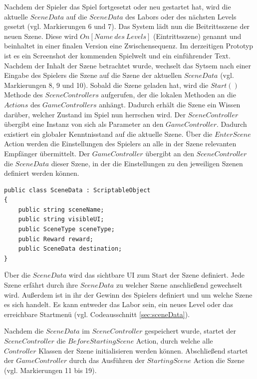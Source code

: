 Nachdem der Spieler das Spiel fortgesetzt oder neu gestartet hat, wird die aktuelle $SceneData$ auf die $SceneData$ des Labors oder des nächsten Levels gesetzt (vgl. Markierungen 6 und 7). Das System lädt nun die Beitrittsszene der neuen Szene. Diese wird $On[Name~ des~ Levels]$ (Eintrittsszene) genannt und beinhaltet in einer finalen Version eine Zwischensequenz. Im derzeitigen Prototyp ist es ein Screenshot der kommenden Spielwelt und ein einführender Text. Nachdem der Inhalt der Szene betrachtet wurde, wechselt das Sytsem nach einer Eingabe des Spielers die Szene auf die Szene der aktuellen $SceneData$ (vgl. Markierungen 8, 9 und 10). Sobald die Szene geladen hat, wird die $Start()$ Methode des $SceneControllers$ aufgerufen, der die lokalen Methoden an die $Actions$ des $GameControllers$ anhängt. Dadurch erhält die Szene ein Wissen darüber, welcher Zustand im Spiel nun herrschen wird. Der $SceneController$ übergibt eine Instanz von sich als Parameter an den $GameController$. Dadurch existiert ein globaler Kenntnisstand auf die aktuelle Szene. Über die $EnterScene$ Action werden die Einstellungen des Spielers an alle in der Szene relevanten Empfänger übermittelt. Der $GameController$ übergibt an den $SceneController$ die $SceneData$ dieser Szene, in der die Einstellungen zu den jeweiligen Szenen definiert werden können.

\begin{lstlisting}[caption={SceneData.ts aus Prototyp}, label={sec:sceneData}]
public class SceneData : ScriptableObject
{
    public string sceneName;
    public string visibleUI;
    public SceneType sceneType;
    public Reward reward;
    public SceneData destination;
}
\end{lstlisting}

Über die $SceneData$ wird das sichtbare \ac{UI} zum Start der Szene definiert. Jede Szene erfährt durch ihre $SceneData$ zu welcher Szene anschließend gewechselt wird. Außerdem ist in ihr der Gewinn des Spielers definiert und um welche Szene es sich handelt. Es kann entweder das Labor sein, ein neues Level oder das erreichbare Startmenü (vgl. Codeausschnitt \ref{sec:sceneData}).

Nachdem die $SceneData$ im $SceneController$ gespeichert wurde, startet der\\ $SceneController$ die $BeforeStartingScene$ Action, durch welche alle\\ $Controller$ Klassen der Szene initialisieren werden können. Abschließend startet der $GameController$ durch das Ausführen der $StartingScene$ Action die Szene (vgl. Markierungen 11 bis 19). 

